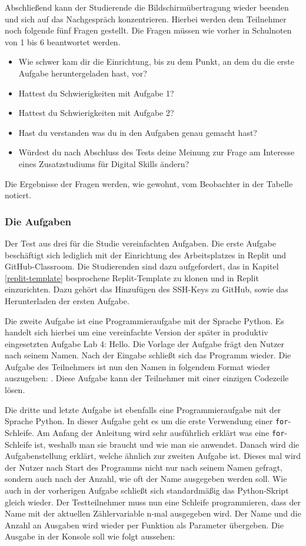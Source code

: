Abschließend kann der Studierende die Bildschirmübertragung wieder beenden und
sich auf das Nachgespräch konzentrieren. Hierbei werden dem Teilnehmer noch
folgende fünf Fragen gestellt. Die Fragen müssen wie vorher in Schulnoten von 1
bis 6 beantwortet werden.
\begin{itemize}
    \item Wie schwer kam dir die Einrichtung, bis zu dem Punkt, an dem du die erste Aufgabe heruntergeladen hast, vor?
    \item Hattest du Schwierigkeiten mit Aufgabe 1?
    \item Hattest du Schwierigkeiten mit Aufgabe 2?
    \item Hast du verstanden was du in den Aufgaben genau gemacht hast?
    \item Würdest du nach Abschluss des Tests deine Meinung zur Frage am
    Interesse eines Zusatzstudiums für Digital Skills ändern?
\end{itemize}

Die Ergebnisse der Fragen werden, wie gewohnt, vom Beobachter in der Tabelle
notiert.

\subsubsection{Die Aufgaben}\label{studie-aufgaben}
Der Test aus drei für die Studie vereinfachten Aufgaben. Die erste Aufgabe
beschäftigt sich lediglich mit der Einrichtung des Arbeitsplatzes in Replit und
GitHub-Classroom. Die Studierenden sind dazu aufgefordert, das in 
Kapitel \ref{replit-template} besprochene Replit-Template zu klonen und in 
Replit einzurichten. Dazu gehört das Hinzufügen des SSH-Keys zu GitHub, sowie
das Herunterladen der ersten Aufgabe.

Die zweite Aufgabe ist eine Programmieraufgabe mit der Sprache Python. Es
handelt sich hierbei um eine vereinfachte Version der später in produktiv
eingesetzten Aufgabe \glqq Lab 4: Hello\grqq{}. Die Vorlage der Aufgabe
frägt den Nutzer nach seinem Namen. Nach der Eingabe schließt sich das Programm
wieder. Die Aufgabe des Teilnehmers ist nun den Namen in folgendem Format
wieder auszugeben: . Diese Aufgabe kann der
Teilnehmer mit einer einzigen Codezeile lösen.

Die dritte und letzte Aufgabe ist ebenfalls eine Programmieraufgabe mit der
Sprache Python. In dieser Aufgabe geht es um die erste Verwendung einer
\texttt{for}-Schleife. Am Anfang der Anleitung wird sehr ausführlich erklärt was
eine \texttt{for}-Schleife ist, weshalb man sie braucht und wie man sie
anwendet. Danach wird die Aufgabenstellung erklärt, welche ähnlich zur zweiten
Aufgabe ist. Dieses mal wird der Nutzer nach Start des Programms nicht nur nach
seinem Namen gefragt, sondern auch nach der Anzahl, wie oft der Name ausgegeben
werden soll. Wie auch in der vorherigen Aufgabe schließt sich standardmäßig das
Python-Skript gleich wieder. Der Testteilnehmer muss nun eine Schleife
programmieren, dass der Name mit der aktuellen Zählervariable n-mal ausgegeben
wird. Der Name und die Anzahl an Ausgaben wird wieder per Funktion als Parameter
übergeben. Die Ausgabe in der Konsole soll wie folgt aussehen:

